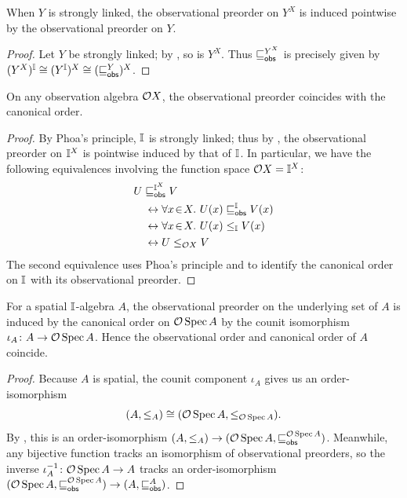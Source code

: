 \begin{corollary}\label{cor:strong-link-obs-pw}
  When $Y$ is strongly linked, the observational preorder on $Y^X$ is induced pointwise by the observational preorder on $Y$.
\end{corollary}

\begin{proof}
  Let $Y$ be strongly linked; by , so is $Y^X$. Thus $\obsle[Y^X]$ is precisely given by $(Y^X)^\mbb{I}\cong (Y^\mbb{I})^X\cong (\obsle[Y])^X$.
\end{proof}

\begin{proposition}[\AxiomSQCP]\label{prop:specordopens}
  On any observation algebra $\mathcal{O}{X}$, the observational preorder coincides with the canonical order.
\end{proposition}

\begin{proof}
  By Phoa's principle, $\mathbb{I}$ is strongly linked; thus by , the observational preorder on $\mathbb{I}^X$ is pointwise induced by that of $\mathbb{I}$. In particular, we have the following equivalences involving the function space $\mathcal{O}{X}=\mathbb{I}^X$:
  \begin{align*}
    &U\obsle[\mbb{I}^X]V \\
    &\quad\eq \fa{x}{X} U(x)\obsle[\mbb{I}] V(x)
    \\
    &\quad\eq \fa{x}{X} U(x)\le_{\mbb{I}} V(x)
    \\
    &\quad\eq U\le_{\opens{X}} V \qedhere
  \end{align*}
  The second equivalence uses Phoa's principle and  to identify the canonical order on $\mathbb{I}$ with its observational preorder.
% 
\end{proof}

\begin{proposition}[\AxiomSQCP]\label{cor:specordonalgiscan}
  For a spatial $\mathbb{I}$-algebra $A$, the observational preorder on the underlying set of $A$ is induced by the canonical order on $\mathcal{O}\operatorname{Spec}{A}$ by the counit isomorphism $\iota_A\colon A\to \mathcal{O}\operatorname{Spec}{A}$. Hence the observational order and canonical order of $A$ coincide.
\end{proposition}

\begin{proof}
  Because $A$ is spatial, the counit component $\iota_A$ gives us an order-isomorphism 
  \[ {(A,\le_A)} \cong (\mathcal{O}\operatorname{Spec}{A},\le_{\mathcal{O}\operatorname{Spec}{A}}). \] 
  By , this is an order-isomorphism ${(A,\le_A)}\to {(\opens\spec{A},\obsle[\opens\spec{A}])}$. Meanwhile, any bijective function tracks an isomorphism of observational preorders, so the inverse $\iota_A^{-1}\colon \mathcal{O}\operatorname{Spec}{A}\to A$ tracks an order-isomorphism  ${(\opens\spec{A},\obsle[\opens\spec{A}])}\to {(A,\obsle[A])}$. 
\end{proof}

